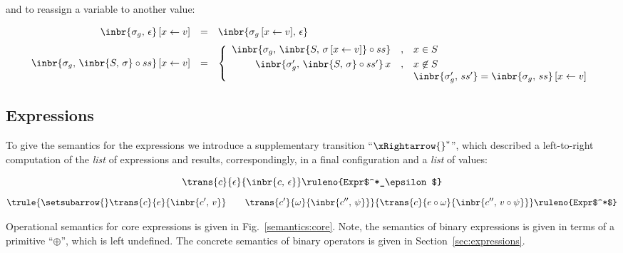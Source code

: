and to reassign a variable to another value:

\[
\begin{array}{rcl}
  \inbr{\sigma_g,\,\epsilon}\,[x\gets v] & = &\inbr{\sigma_g\,[x\gets v],\,\epsilon}\\[2mm]
  \inbr{\sigma_g,\,\inbr{S,\,\sigma}\circ ss}\,[x\gets v]  & = & \left\{\begin{array}{rcl}
                                                                          \inbr{\sigma_g,\,\inbr{S,\,\sigma\,[x\gets v]}\circ ss} &,& x\in S\\[1mm]
                                                                          \inbr{\sigma^\prime_g,\,\inbr{S,\,\sigma}\circ ss^\prime}\,x &,&x\not\in S\\
                                                                                                                                    & &\inbr{\sigma^\prime_g,\,ss^\prime}=\inbr{\sigma_g,\,ss}\,[x\gets v]
                                                                        \end{array}
                                                                 \right.
\end{array}
\]

\subsection{Expressions}

To give the semantics for the expressions we introduce a supplementary transition ``$\xRightarrow{}^*$'', which described a left-to-right computation
of the \emph{list} of expressions and results, correspondingly, in a final configuration and a \emph{list} of values:

\setarrow{\xRightarrow}
\[ 
\trans{c}{\epsilon}{\inbr{c,\,\epsilon}}\ruleno{Expr$^*_\epsilon$} 
\]
\[ 
\trule{{\setsubarrow{}\trans{c}{e}{\inbr{c^\prime,\,v}}}\qquad\trans{c^\prime}{\omega}{\inbr{c^{\prime\prime},\,\psi}}}
      {\trans{c}{e\circ\omega}{\inbr{c^{\prime\prime},\,v\circ\psi}}}\ruleno{Expr$^*$} 
\]

Operational semantics for core expressions is given in Fig.~\ref{semantics:core}. Note, the semantics of binary expressions is
given in terms of a primitive ``$\oplus$'', which is left undefined. The concrete semantics of binary operators is
given in Section~\ref{sec:expressions}.

